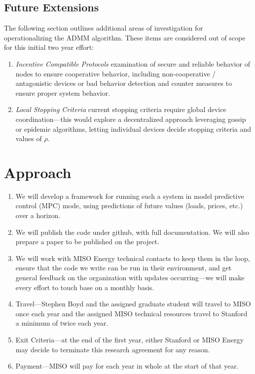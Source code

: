 \documentclass[12pt]{article}
\begin{document}
\subsection{Future Extensions}

The following section outlines additional areas of investigation
for operationalizing the ADMM algorithm.
These items are considered out of scope for this initial two year effort:

\begin{enumerate}
\item \emph{Incentive Compatible Protocols}
examination of secure and reliable behavior of nodes to
ensure cooperative behavior,
including non-cooperative / antagonistic devices or bad behavior
detection and counter measures to ensure proper system behavior.

\item \emph{Local Stopping Criteria}
current stopping criteria require global device coordination---this
would explore a decentralized approach leveraging gossip or epidemic algorithms, letting
individual devices decide stopping criteria and values of $\rho$.
\end{enumerate}

\section{Approach}

\begin{enumerate}
\item 
We will develop a framework for running such a system in model predictive control (MPC)
mode, using predictions of future values (loads, prices, etc.) over a horizon.

\item
We will publish the code under github,
with full documentation. We will also prepare a paper to be published on the project.

\item 
We will work with MISO Energy technical contacts to keep them in the loop,
ensure that the code we write can be run in their environment,
and get general feedback on the organization with updates
occurring---we will make every effort to touch base on a monthly basis.

\item Travel---Stephen Boyd and the assigned graduate student
will travel to MISO once each year and the assigned MISO technical resources travel
to Stanford a minimum of twice each year.

\item Exit Criteria---at the end of the first year,
either Stanford or MISO Energy may decide to
terminate this research agreement for any reason.

\item Payment---MISO will pay for each year in whole at the start of that year.
\end{enumerate}
\end{document}
